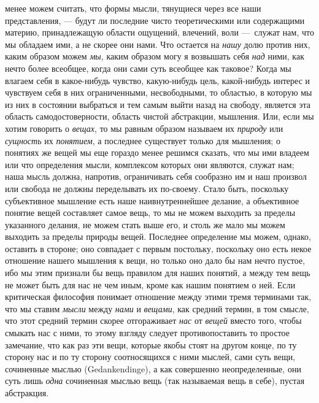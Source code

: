 менее можем считать, что формы мысли, тянущиеся через все наши
представления, — будут ли последние чисто теоретическими или содержащими
материю, принадлежащую области ощущений, влечений, воли —~служат нам, что
мы обладаем ими, а не скорее они нами. Что остается на
{\em нашу} долю против них, каким образом можем
{\em мы}, каким образом могу я возвышать себя
{\em над} ними, как нечто более всеобщее, когда они
сами суть всеобщее как таковое? Когда мы влагаем себя в какое-нибудь
чувство, какую-нибудь цель, какой-нибудь интерес и чувствуем себя в них
ограниченными, несвободными, то областью, в которую мы из них в состоянии
выбраться и тем самым выйти назад на свободу, является эта область
самодостоверности, область чистой абстракции, мышления. Или, если мы хотим
говорить о {\em вещах}, то мы равным образом называем
их {\em природу} или {\em сущность}
их {\em понятием}, а последнее существует только для
мышления; о понятиях же вещей мы еще гораздо менее решимся сказать, что мы
ими владеем или что определения мысли, комплексом которых они являются,
служат нам; наша мысль должна, напротив, ограничивать себя сообразно им и
наш произвол или свобода не должны переделывать их по-своему. Стало быть,
поскольку субъективное мышление есть наше наивнутреннейшее делание, а
объективное понятие вещей составляет самое вещь, то мы не можем выходить за
пределы указанного делания, не можем стать выше его, и столь же мало мы
можем выходить за пределы природы вещей. Последнее определение мы можем,
однако, оставить в стороне; оно совпадает с первым постольку, поскольку оно
есть некое отношение нашего мышления к вещи, но только оно дало бы нам
нечто пустое, ибо мы этим признали бы вещь правилом для наших понятий, а
между тем вещь не может быть для нас не чем иным, кроме как нашим понятием
о ней. Если критическая философия понимает отношение между этими тремя
терминами так, что мы ставим {\em мысли} между
{\em нами} и {\em вещами}, как
средний термин, в том смысле, что этот средний термин скорее отгораживает
{\em нас} от {\em вещей} вместо
того, чтобы смыкать нас с ними, то этому взгляду следует противопоставить
то простое замечание, что как раз эти вещи, которые якобы стоят на другом
конце, по ту сторону нас и по ту сторону соотносящихся с ними мыслей, сами
суть вещи, сочиненные мыслью (Gedankendinge), а как совершенно
неопределенные, они суть лишь {\em одна} сочиненная
мыслью вещь (так называемая вещь в себе), пустая абстракция.

